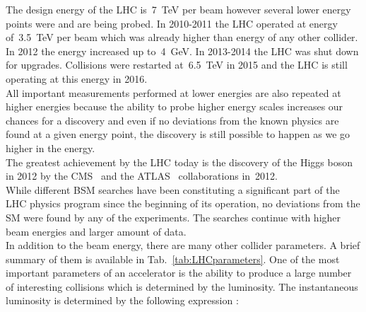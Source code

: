 

The design energy of the LHC is~7~TeV per beam however several lower energy points were and are being probed. In 2010-2011 the LHC operated at energy of~3.5~TeV per beam which was already higher than energy of any other collider. In 2012 the energy increased up to~4~GeV. In 2013-2014 the LHC was shut down for upgrades. Collisions were restarted at~6.5~TeV in 2015 and the LHC is still operating at this energy in 2016.\\ 

All important measurements performed at lower energies are also repeated at higher energies because the ability to probe higher energy scales increases our chances for a discovery and even if no deviations from the known physics are found at a given energy point, the discovery is still possible to happen as we go higher in the energy. \\ 

The greatest achievement by the LHC today is the discovery of the Higgs boson in 2012 by the CMS~\cite{ref_HiggsPaperCMS} and the ATLAS~\cite{ref_HiggsPaperATLAS} collaborations in~2012. \\


While different BSM searches have been constituting a significant part of the LHC physics program since the beginning of its operation, no deviations from the SM were found by any of the experiments. The searches continue with higher beam energies and larger amount of data.\\


In addition to the beam energy, there are many other collider parameters. A brief summary of them is available in Tab.~\ref{tab:LHCparameters}. One of the most important parameters of an accelerator is the ability to produce a large number of interesting collisions which is determined by the luminosity. The instantaneous luminosity is determined by the following expression \cite{ref_PDG}:\\

